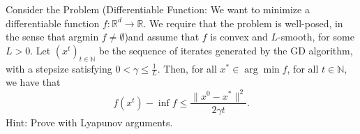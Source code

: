 \documentclass{ExerciseSheet}
\begin{document}



\begin{problem}
Consider the Problem (Differentiable Function: We want to minimize a differentiable function $f: \mathbb{R}^d \rightarrow \mathbb{R}$. We require that the problem is well-posed, in the sense that argmin $f \neq \emptyset $)and assume that $f $ is convex and $L $-smooth, for some $ L > 0 $. Let $ (x^t)_{t \in \mathbb{N}} $ be the sequence of iterates generated by the GD algorithm, with a stepsize satisfying $ 0 < \gamma \leq \frac{1}{L} $. Then, for all $x^* \in \arg\min f $, for all $ t \in \mathbb{N} $, we have that
\begin{equation*}
    f(x^t) - \inf f \leq \frac{\|x^0 - x^*\|^2}{2 \gamma t}.
\end{equation*}
Hint: Prove with Lyapunov arguments.
\end{problem}
\end{document}
